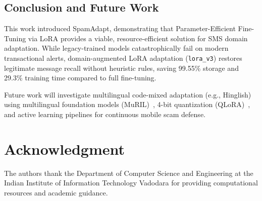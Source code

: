 \documentclass[conference]{IEEEtran}
\begin{document}
\subsection{Conclusion and Future Work}
This work introduced SpamAdapt, demonstrating that Parameter-Efficient Fine-Tuning via LoRA provides a viable, resource-efficient solution for SMS domain adaptation. While legacy-trained models catastrophically fail on modern transactional alerts, domain-augmented LoRA adaptation (\texttt{lora\_v3}) restores legitimate message recall without heuristic rules, saving 99.55\% storage and 29.3\% training time compared to full fine-tuning.

Future work will investigate multilingual code-mixed adaptation (e.g., Hinglish) using multilingual foundation models (MuRIL)~\cite{khanuja2021muril}, 4-bit quantization (QLoRA)~\cite{dettmers2024qlora}, and active learning pipelines for continuous mobile scam defense.

\section*{Acknowledgment}
The authors thank the Department of Computer Science and Engineering at the Indian Institute of Information Technology Vadodara for providing computational resources and academic guidance.
\end{document}
